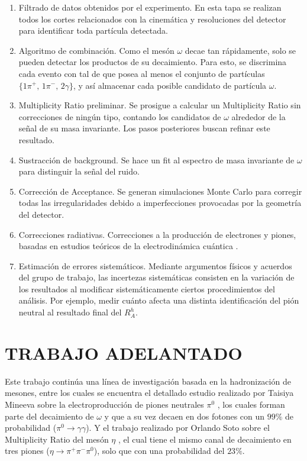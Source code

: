 \begin{enumerate}
    \item Filtrado de datos obtenidos por el experimento. En esta tapa se realizan todos los cortes relacionados con la cinemática y resoluciones del detector para identificar toda partícula detectada.
    \item Algoritmo de combinación. Como el mesón $\omega$ decae tan rápidamente, solo se pueden detectar los productos de su decaimiento. Para esto, se discrimina cada evento con tal de que posea al menos el conjunto de partículas $\lbrace 1 \pi^+,\,1 \pi^-,\,2 \gamma \rbrace$, y así almacenar cada posible candidato de partícula $\omega$.
    \item Multiplicity Ratio preliminar. Se prosigue a calcular un Multiplicity Ratio sin correcciones de ningún tipo, contando los candidatos de $\omega$ alrededor de la señal de su masa invariante. Los pasos posteriores buscan refinar este resultado.
    \item Sustracción de background. Se hace un fit al espectro de masa invariante de $\omega$ para distinguir la señal del ruido.
    \item Corrección de Acceptance. Se generan simulaciones Monte Carlo para corregir todas las irregularidades debido a imperfecciones provocadas por la geometría del detector.
    \item Correcciones radiativas. Correcciones a la producción de electrones y piones, basadas en estudios teóricos de la electrodinámica cuántica \cite{rc1, rc2}.
    \item Estimación de errores sistemáticos. Mediante argumentos físicos y acuerdos del grupo de trabajo, las incertezas sistemáticas consisten en la variación de los resultados al modificar sistemáticamente ciertos procedimientos del análisis. Por ejemplo, medir cuánto afecta una distinta identificación del pión neutral al resultado final del $R^h_A$.
\end{enumerate}

\section{TRABAJO ADELANTADO}

Este trabajo continúa una línea de investigación basada en la hadronización de mesones, entre los cuales se encuentra el detallado estudio realizado por Taisiya Mineeva sobre la electroproducción de piones neutrales $\pi^0$ \cite{tm}, los cuales forman parte del decaimiento de $\omega$ y que a su vez decaen en dos fotones con un $99\%$ de probabilidad ($\pi^0 \rightarrow \gamma \gamma$). Y el trabajo realizado por Orlando Soto sobre el Multiplicity Ratio del mesón $\eta$ \cite{os}, el cual tiene el mismo canal de decaimiento en tres piones ($\eta \rightarrow \pi^+ \pi^{-} \pi^0$), solo que con una probabilidad del $23\%$.

